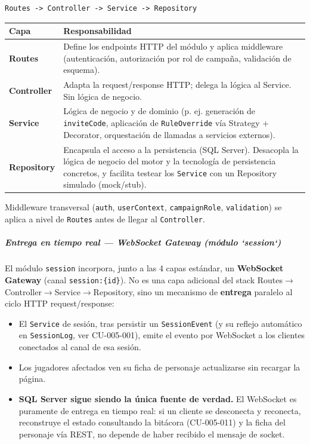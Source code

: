 \begin{verbatim}
Routes -> Controller -> Service -> Repository
\end{verbatim}
{\small\setlength{\tabcolsep}{4pt}\renewcommand{\arraystretch}{1.15}
\begin{longtable}{|>{\raggedright\arraybackslash}p{7.7cm}|>{\raggedright\arraybackslash}p{7.7cm}|}
\hline
\textbf{Capa} & \textbf{Responsabilidad} \\ \hline\endhead
\textbf{Routes} & Define los endpoints HTTP del módulo y aplica middleware (autenticación, autorización por rol de campaña, validación de esquema). \\ \hline
\textbf{Controller} & Adapta la request/response HTTP; delega la lógica al Service. Sin lógica de negocio. \\ \hline
\textbf{Service} & Lógica de negocio y de dominio (p. ej. generación de \texttt{inviteCode}, aplicación de \texttt{RuleOverride} vía Strategy + Decorator, orquestación de llamadas a servicios externos). \\ \hline
\textbf{Repository} & Encapsula el acceso a la persistencia (SQL Server). Desacopla la lógica de negocio del motor y la tecnología de persistencia concretos, y facilita testear los \texttt{Service} con un Repository simulado (mock/stub). \\ \hline
\end{longtable}}
Middleware transversal (\texttt{auth}, \texttt{userContext}, \texttt{campaignRole}, \texttt{validation}) se aplica a nivel de \texttt{Routes} antes de llegar al \texttt{Controller}.

\subparagraph{Entrega en tiempo real — WebSocket Gateway (módulo `session`)}
El módulo \texttt{session} incorpora, junto a las 4 capas estándar, un \textbf{WebSocket Gateway} (canal \texttt{session:\{id\}}). No es una capa adicional del stack Routes$\rightarrow$Controller$\rightarrow$Service$\rightarrow$Repository, sino un mecanismo de \textbf{entrega} paralelo al ciclo HTTP request/response:

\begin{itemize}[itemsep=2pt,topsep=2pt]
\item El \texttt{Service} de sesión, tras persistir un \texttt{SessionEvent} (y su reflejo automático en \texttt{SessionLog}, ver CU-005-001), emite el evento por WebSocket a los clientes conectados al canal de esa sesión.
\item Los jugadores afectados ven su ficha de personaje actualizarse sin recargar la página.
\item \textbf{SQL Server sigue siendo la única fuente de verdad.} El WebSocket es puramente de entrega en tiempo real: si un cliente se desconecta y reconecta, reconstruye el estado consultando la bitácora (CU-005-011) y la ficha del personaje vía REST, no depende de haber recibido el mensaje de socket.
\end{itemize}
